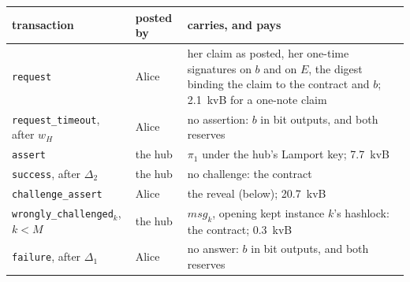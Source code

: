 \documentclass[11pt]{article}
\newcommand{\tx}[1]{\texttt{#1}}
\begin{document}
\begin{center}
\small
\begin{tabularx}{\linewidth}{>{\raggedright\arraybackslash}p{34mm}>{\raggedright\arraybackslash}p{18mm}L}
\toprule
transaction & posted by & carries, and pays \\
\midrule
\tx{request} & Alice & her claim as posted, her one-time signatures on $b$ and on $E$, the digest binding the claim to the contract and $b$; 2.1~kvB for a one-note claim \\
\tx{request\_timeout}, after $w_H$ & Alice & no assertion: $b$ in bit outputs, and both reserves \\
\tx{assert} & the hub & $\pi_1$ under the hub's Lamport key; 7.7~kvB \\
\tx{success}, after $\Delta_2$ & the hub & no challenge: the contract \\
\tx{challenge\_assert} & Alice & the reveal (below); 20.7~kvB \\
\tx{wrongly\_\allowbreak challenged}$_k$, $k < M$ & the hub & $\mathit{msg}_k$, opening kept instance $k$'s hashlock: the contract; 0.3~kvB \\
\tx{failure}, after $\Delta_1$ & Alice & no answer: $b$ in bit outputs, and both reserves \\
\bottomrule
\end{tabularx}
\end{center}
\end{document}
